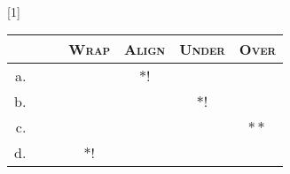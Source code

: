 \begin{exe}
		\ex ~\\
		
		\vspace{-1cm}\label{nlttPaperot tableau: v inf WA}\label{nlttPaperot tableau: v inf} \renewcommand*\arraystretch{1.2}
		\scalebox{1}[1]{\begin{tabular}[t]{|rrl||c:c|c|c|} \hline
				 & \textsc{Wrap} &\textsc{Align} & \textsc{Under} & \textsc{Over} \\[0.5ex]
				\hline \hline a. & &  && $\ast$! &  &  \\
				\hline b. & &  & & & $\ast$! &  \\
				\hline c. &  &  & & & & $\ast\ast$ \\
				\hline d. & &  & $\ast!$ & &  &  \\
				\hline \end{tabular}} \renewcommand*\arraystretch{1} 
		
		
		
		
		
		
	
\end{exe}





